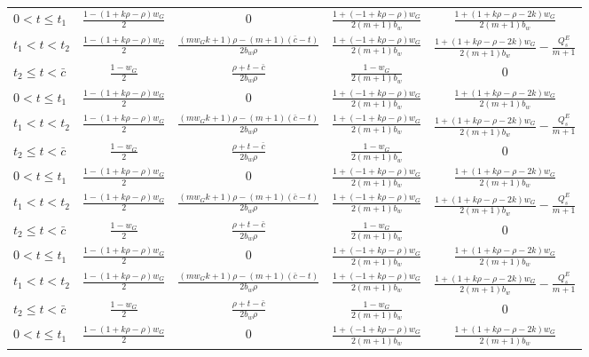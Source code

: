 \documentclass{setp-new}
\begin{document}
\begin{table}[H]
\begin{tabular}{lcccc}
\hline
  $0<t\leq t_{1}$ & $\frac{1-(1+k\rho-\rho)w_{G}}{2}$ & 0 &$ \frac{1+(-1+k\rho-\rho)w_{G}}{2(m+1)b_{w}} $ &  $\frac{1+(1+k\rho-\rho-2k)w_{G}}{2(m+1)b_{w}}$ \\
 $t_{1}<t<t_{2}$  & $\frac{1-(1+k\rho-\rho)w_{G}}{2}$ & $ \frac{(mw_{G}k+1)\rho-(m+1)(\bar{c}-t)}{2 b_{w}\rho} $  &$ \frac{1+(-1+k\rho-\rho)w_{G}}{2(m+1)b_{w}} $ & $\frac{1+(1+k\rho-\rho-2k)w_{G}}{2(m+1)b_{w}}-\frac{Q_{s}^{E}}{m+1}$  \\
 $t_{2}\leq t<\bar{c}$ & $\frac{1-w_{G}}{2}$ & $\frac{\rho+t-\bar{c}}{2 b_{w}\rho}$ &$ \frac{1-w_{G}}{2(m+1)b_{w}} $ & 0  \\  $0<t\leq t_{1}$ & $\frac{1-(1+k\rho-\rho)w_{G}}{2}$ & 0 &$ \frac{1+(-1+k\rho-\rho)w_{G}}{2(m+1)b_{w}} $ &  $\frac{1+(1+k\rho-\rho-2k)w_{G}}{2(m+1)b_{w}}$ \\
 $t_{1}<t<t_{2}$  & $\frac{1-(1+k\rho-\rho)w_{G}}{2}$ & $ \frac{(mw_{G}k+1)\rho-(m+1)(\bar{c}-t)}{2 b_{w}\rho} $  &$ \frac{1+(-1+k\rho-\rho)w_{G}}{2(m+1)b_{w}} $ & $\frac{1+(1+k\rho-\rho-2k)w_{G}}{2(m+1)b_{w}}-\frac{Q_{s}^{E}}{m+1}$  \\
 $t_{2}\leq t<\bar{c}$ & $\frac{1-w_{G}}{2}$ & $\frac{\rho+t-\bar{c}}{2 b_{w}\rho}$ &$ \frac{1-w_{G}}{2(m+1)b_{w}} $ & 0  \\  $0<t\leq t_{1}$ & $\frac{1-(1+k\rho-\rho)w_{G}}{2}$ & 0 &$ \frac{1+(-1+k\rho-\rho)w_{G}}{2(m+1)b_{w}} $ &  $\frac{1+(1+k\rho-\rho-2k)w_{G}}{2(m+1)b_{w}}$ \\
 $t_{1}<t<t_{2}$  & $\frac{1-(1+k\rho-\rho)w_{G}}{2}$ & $ \frac{(mw_{G}k+1)\rho-(m+1)(\bar{c}-t)}{2 b_{w}\rho} $  &$ \frac{1+(-1+k\rho-\rho)w_{G}}{2(m+1)b_{w}} $ & $\frac{1+(1+k\rho-\rho-2k)w_{G}}{2(m+1)b_{w}}-\frac{Q_{s}^{E}}{m+1}$  \\
 $t_{2}\leq t<\bar{c}$ & $\frac{1-w_{G}}{2}$ & $\frac{\rho+t-\bar{c}}{2 b_{w}\rho}$ &$ \frac{1-w_{G}}{2(m+1)b_{w}} $ & 0  \\  $0<t\leq t_{1}$ & $\frac{1-(1+k\rho-\rho)w_{G}}{2}$ & 0 &$ \frac{1+(-1+k\rho-\rho)w_{G}}{2(m+1)b_{w}} $ &  $\frac{1+(1+k\rho-\rho-2k)w_{G}}{2(m+1)b_{w}}$ \\
 $t_{1}<t<t_{2}$  & $\frac{1-(1+k\rho-\rho)w_{G}}{2}$ & $ \frac{(mw_{G}k+1)\rho-(m+1)(\bar{c}-t)}{2 b_{w}\rho} $  &$ \frac{1+(-1+k\rho-\rho)w_{G}}{2(m+1)b_{w}} $ & $\frac{1+(1+k\rho-\rho-2k)w_{G}}{2(m+1)b_{w}}-\frac{Q_{s}^{E}}{m+1}$  \\
 $t_{2}\leq t<\bar{c}$ & $\frac{1-w_{G}}{2}$ & $\frac{\rho+t-\bar{c}}{2 b_{w}\rho}$ &$ \frac{1-w_{G}}{2(m+1)b_{w}} $ & 0  \\  $0<t\leq t_{1}$ & $\frac{1-(1+k\rho-\rho)w_{G}}{2}$ & 0 &$ \frac{1+(-1+k\rho-\rho)w_{G}}{2(m+1)b_{w}} $ &  $\frac{1+(1+k\rho-\rho-2k)w_{G}}{2(m+1)b_{w}}$ \\

\end{tabular}
\end{table}
\end{document}
